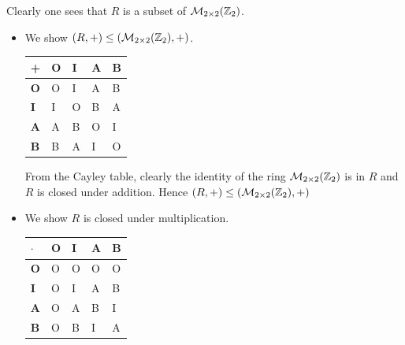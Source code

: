 \begin{questions}
    \begin{partquestions}{\roman*}
        \item Clearly one sees that $R$ is a subset of $\mathcal{M}_{2\times2}(\mathbb{Z}_2)$.
        \begin{itemize}
            \item We show $(R, +)\leq(\mathcal{M}_{2\times2}(\mathbb{Z}_2),+)$.
            \begin{table}[h]
                \centering
                \begin{tabular}{|l|l|l|l|l|}
                    \hline
                    \textbf{+} & \textbf{O} & \textbf{I} & \textbf{A} & \textbf{B} \\ \hline
                    \textbf{O} & O          & I          & A          & B          \\ \hline
                    \textbf{I} & I          & O          & B          & A          \\ \hline
                    \textbf{A} & A          & B          & O          & I          \\ \hline
                    \textbf{B} & B          & A          & I          & O          \\ \hline
                \end{tabular}
            \end{table}
            
            From the Cayley table, clearly the identity of the ring $\mathcal{M}_{2\times2}(\mathbb{Z}_2)$ is in $R$ and $R$ is closed under addition. Hence $(R, +)\leq(\mathcal{M}_{2\times2}(\mathbb{Z}_2),+)$

            \item We show $R$ is closed under multiplication.
            \begin{table}[h]
                \centering
                \begin{tabular}{|l|l|l|l|l|}
                    \hline
                    $\boldsymbol{\cdot}$ & \textbf{O} & \textbf{I} & \textbf{A} & \textbf{B} \\ \hline
                    \textbf{O}           & O          & O          & O          & O          \\ \hline
                    \textbf{I}           & O          & I          & A          & B          \\ \hline
                    \textbf{A}           & O          & A          & B          & I          \\ \hline
                    \textbf{B}           & O          & B          & I          & A          \\ \hline
                \end{tabular}
            \end{table}
            

\end{itemize}
\end{partquestions}
\end{questions}
